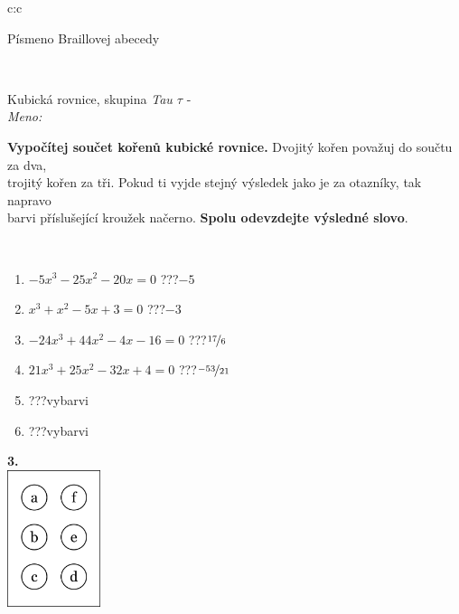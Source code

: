 \documentclass[10pt]{report}
\begin{document}
\begin{tabular}{c:c}
\begin{minipage}[c][104.5mm][t]{0.5\linewidth}
\begin{center}
\begin{minipage}{0.20\linewidth}
\begin{center}
{\small Písmeno Braillovej abecedy}
\end{center}
\end{minipage}
\end{center}
\end{minipage}
\\ \hdashline
\begin{minipage}[c][104.5mm][t]{0.5\linewidth}
\begin{center}
\vspace{7mm}
{\huge Kubická rovnice, skupina \textit{Tau $\tau$} -}\\[5mm]
\textit{Meno:}\phantom{xxxxxxxxxxxxxxxxxxxxxxxxxxxxxxxxxxxxxxxxxxxxxxxxxxxxxxxxxxxxxxxxx}\\[5mm]
\begin{minipage}{0.95\linewidth}
\textbf{Vypočítej součet kořenů kubické rovnice.} Dvojitý kořen považuj do součtu za dva,\\trojitý kořen za tři. Pokud ti vyjde stejný výsledek jako je za otazníky, tak napravo\\barvi příslušející kroužek načerno. \textbf{Spolu odevzdejte výsledné slovo}.
\end{minipage}
\\[1mm]
\begin{minipage}{0.79\linewidth}
\begin{center}
\begin{varwidth}{\linewidth}
\begin{enumerate}
\Large
\item $-5x^3-25x^2-20x=0$\quad \dotfill\; ???\;\dotfill \quad $-5$
\item $x^3+x^2-5x+3=0$\quad \dotfill\; ???\;\dotfill \quad $-3$
\item $-24x^3+44x^2-4x-16=0$\quad \dotfill\; ???\;\dotfill \quad $\nicefrac{17}{6}$
\item $21x^3+25x^2-32x+4=0$\quad \dotfill\; ???\;\dotfill \quad $\nicefrac{-53}{21}$
\item \quad \dotfill\; ???\;\dotfill \quad vybarvi
\item \quad \dotfill\; ???\;\dotfill \quad vybarvi
\end{enumerate}
\end{varwidth}
\end{center}
\end{minipage}
\begin{minipage}{0.20\linewidth}
\begin{center}
{\Huge\bfseries 3.} \\[2mm]
\includegraphics[height=40mm]{../images/braille.png}

\end{center}
\end{minipage}
\end{center}
\end{minipage}
\end{tabular}
\end{document}

